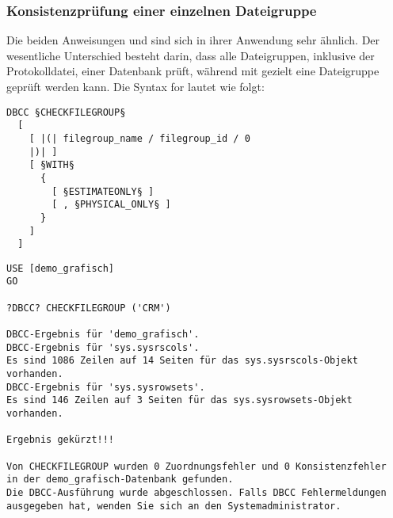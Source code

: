         \subsubsection{Konsistenzprüfung einer einzelnen Dateigruppe}
          Die beiden Anweisungen  und
           sind sich in ihrer Anwendung sehr
          ähnlich. Der wesentliche Unterschied besteht darin, dass
           alle Dateigruppen, inklusive der Protokolldatei,
          einer Datenbank prüft, während mit 
          gezielt eine Dateigruppe geprüft werden kann. Die Syntax for
           lautet wie folgt:
          \begin{lstlisting}[language=ebnf, caption={Die Syntax zu
          CHECKFILEGROUP}, label=admin03_30]
DBCC §CHECKFILEGROUP§
  [
    [ |(| filegroup_name / filegroup_id / 0 
    |)| ]
    [ §WITH§
      {
        [ §ESTIMATEONLY§ ]
        [ , §PHYSICAL_ONLY§ ]
      }
    ]
  ]        
        \end{lstlisting}
        \begin{lstlisting}[language=ms_sql,caption={Konsistenzprüfung
        einer Dateigruppe},label=admin03_31] 
USE [demo_grafisch]
GO

?DBCC? CHECKFILEGROUP ('CRM')

DBCC-Ergebnis für 'demo_grafisch'.
DBCC-Ergebnis für 'sys.sysrscols'.
Es sind 1086 Zeilen auf 14 Seiten für das sys.sysrscols-Objekt vorhanden.
DBCC-Ergebnis für 'sys.sysrowsets'.
Es sind 146 Zeilen auf 3 Seiten für das sys.sysrowsets-Objekt vorhanden.

Ergebnis gekürzt!!!

Von CHECKFILEGROUP wurden 0 Zuordnungsfehler und 0 Konsistenzfehler
in der demo_grafisch-Datenbank gefunden.
Die DBCC-Ausführung wurde abgeschlossen. Falls DBCC Fehlermeldungen 
ausgegeben hat, wenden Sie sich an den Systemadministrator.
        \end{lstlisting}
